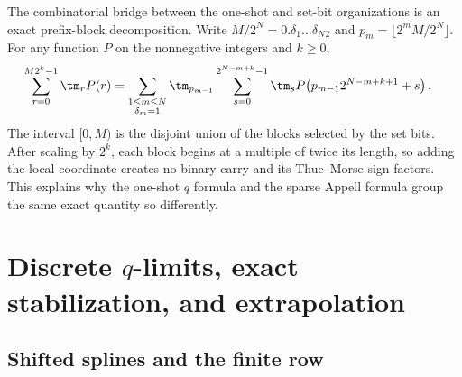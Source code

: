 \documentclass[11pt,oneside]{article}
\theoremstyle{definition}
\theoremstyle{remark}
\begin{document}
The combinatorial bridge between the one-shot and set-bit organizations is an exact
prefix-block decomposition.  Write
$M/2^N=0.\delta_1\ldots\delta_N{}_2$ and
$p_m=\lfloor2^mM/2^N\rfloor$.  For any function $P$ on the nonnegative integers and
$k\ge0$,
\begin{align}
 \sum_{r=0}^{M2^k-1}\tm_rP(r)
 &=\sum_{\substack{1\le m\le N\\\delta_m=1}}
 \tm_{p_{m-1}}
 \sum_{s=0}^{2^{N-m+k}-1}\tm_s
 P\!\left(p_{m-1}2^{N-m+k+1}+s\right).
 \label{dyadicweb:eq:prefix-block-decomposition}
\end{align}
The interval $[0,M)$ is the disjoint union of the blocks selected by the set bits.
After scaling by $2^k$, each block begins at a multiple of twice its length, so adding
the local coordinate creates no binary carry and its Thue--Morse sign factors.  This
explains why the one-shot $q$ formula and the sparse Appell formula group the same exact
quantity so differently.

\section[Discrete q-limits, exact stabilization, and extrapolation]{Discrete $q$-limits, exact stabilization, and extrapolation}
\label{dyadicweb:sec:discrete}

\subsection{Shifted splines and the finite row}
\end{document}
